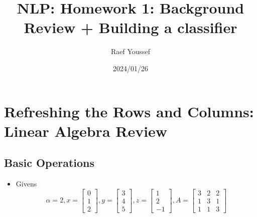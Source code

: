 \documentclass{article}
\begin{document}
\title{NLP: Homework 1: Background Review + Building a classifier}
\author{Raef Youssef}
\date{2024/01/26}
\maketitle                      %

\section{Refreshing the Rows and Columns: Linear Algebra Review}
\subsection{Basic Operations}
\begin{itemize}
    \item Givens
    \[
        \alpha = 2, 
        x = \begin{bmatrix} 
            0  \\ 
            1  \\ 
            2  
        \end{bmatrix},  
        y = \begin{bmatrix} 
            3  \\ 
            4  \\ 
            5  
        \end{bmatrix}, 
         z = \begin{bmatrix} 
            1  \\ 
            2  \\ 
            -1  
        \end{bmatrix}, 
        A = \begin{bmatrix} 
            3 & 2 & 2  \\ 
            1 & 3 & 1  \\ 
            1 & 1 & 3  
        \end{bmatrix}
    \]
\end{itemize}
\end{document}
